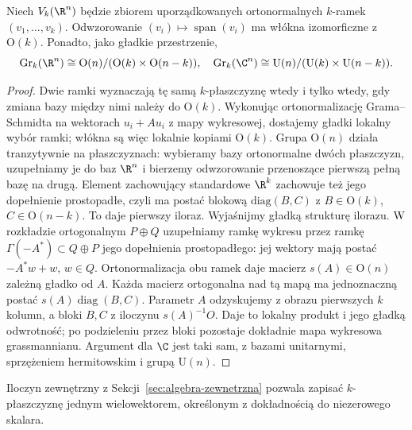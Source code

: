 \begin{stwierdzenie}
\label{prop:grass-stiefel}
Niech $V_k(\R^n)$ będzie zbiorem uporządkowanych
ortonormalnych $k$-ramek $(v_1,\ldots,v_k)$.
Odwzorowanie $(v_i)\mapsto\operatorname{span}(v_i)$ ma
włókna izomorficzne z $\mathrm O(k)$.
Ponadto, jako gładkie przestrzenie,
\[
 \operatorname{Gr}_k(\R^n)
   \cong\mathrm O(n)/(\mathrm O(k)\times\mathrm O(n-k)),
\quad
 \operatorname{Gr}_k(\C^n)
   \cong\mathrm U(n)/(\mathrm U(k)\times\mathrm U(n-k)).
\]
\end{stwierdzenie}
\begin{proof}
Dwie ramki wyznaczają tę samą $k$-płaszczyznę wtedy
i tylko wtedy, gdy zmiana bazy między nimi należy do
$\mathrm O(k)$. Wykonując ortonormalizację Grama--Schmidta
na wektorach $u_i+Au_i$ z mapy wykresowej, dostajemy
gładki lokalny wybór ramki; włókna są więc lokalnie
kopiami $\mathrm O(k)$. Grupa $\mathrm O(n)$ działa
tranzytywnie na płaszczyznach: wybieramy bazy ortonormalne
dwóch płaszczyzn, uzupełniamy je do baz $\R^n$ i bierzemy
odwzorowanie przenoszące pierwszą pełną bazę na drugą.
Element zachowujący standardowe $\R^k$ zachowuje też
jego dopełnienie prostopadłe, czyli ma postać blokową
$\mathrm{diag}(B,C)$ z $B\in\mathrm O(k)$,
$C\in\mathrm O(n-k)$. To daje pierwszy iloraz.
Wyjaśnijmy gładką strukturę ilorazu. W rozkładzie ortogonalnym
$P\oplus Q$ uzupełniamy ramkę wykresu przez ramkę
$\Gamma(-A^*)\subset Q\oplus P$ jego dopełnienia prostopadłego:
jej wektory mają postać $-A^*w+w$, $w\in Q$.
Ortonormalizacja obu ramek daje macierz $s(A)\in\mathrm O(n)$
zależną gładko od $A$. Każda macierz ortogonalna nad tą mapą
ma jednoznaczną postać $s(A)\operatorname{diag}(B,C)$.
Parametr $A$ odzyskujemy z obrazu pierwszych $k$ kolumn,
a bloki $B,C$ z iloczynu $s(A)^{-1}O$. Daje to lokalny
produkt i jego gładką odwrotność; po podzieleniu przez bloki
pozostaje dokładnie mapa wykresowa grassmannianu.
Argument dla $\C$ jest taki sam, z bazami unitarnymi,
sprzężeniem hermitowskim i grupą $\mathrm U(n)$.
\end{proof}

Iloczyn zewnętrzny z Sekcji~\ref{sec:algebra-zewnetrzna}
pozwala zapisać $k$-płaszczyznę jednym wielowektorem,
określonym z dokładnością do niezerowego skalara.

